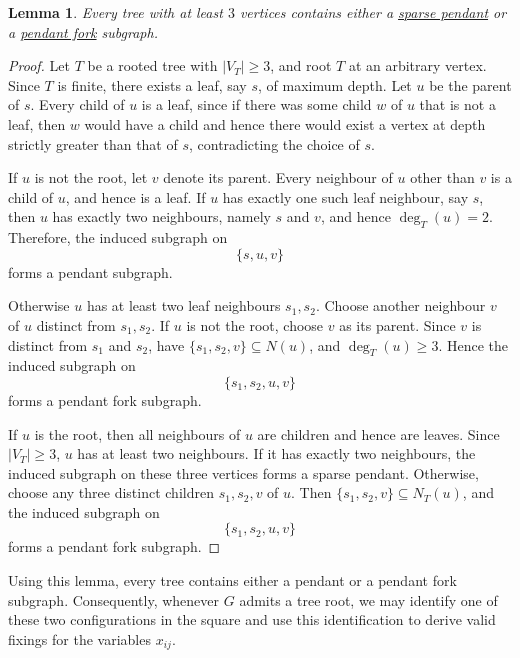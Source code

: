 \documentclass[11pt]{report}
\newtheorem{lemma}{Lemma}
\begin{document}
\begin{lemma} \label{lemma::tree_pendant_pendant_fork}
  Every tree with at least $3$ vertices contains either a \hyperref[def::sparse_pendant]{sparse pendant} or a \hyperref[def::pendant_fork]{pendant fork} subgraph.
\end{lemma}
\begin{proof} 
  Let $T$ be a rooted tree with $|V_T| \ge 3$, and root $T$ at an arbitrary vertex. Since $T$ is finite, there exists a leaf, say $s$, of maximum depth. Let $u$ be the parent of $s$. Every child of $u$ is a leaf, since if there was some child $w$ of $u$ that is not a leaf, then $w$ would have a child and hence there would exist a vertex at depth strictly greater than that of $s$, contradicting the choice of $s$.

  If $u$ is not the root, let $v$ denote its parent. Every neighbour of $u$ other than $v$ is a child of $u$, and hence is a leaf. If $u$ has exactly one such leaf neighbour, say $s$, then $u$ has exactly two neighbours, namely $s$ and $v$, and hence $\deg_T(u)=2$. Therefore, the induced subgraph on
  \[
  \{s,u,v\}
  \]
  forms a pendant subgraph.

  Otherwise $u$ has at least two leaf neighbours $s_1,s_2$. Choose another neighbour $v$ of $u$ distinct from $s_1,s_2$. If $u$ is not the root, choose $v$ as its parent. Since $v$ is distinct from $s_1$ and $s_2$, have $\{s_1,s_2,v\}\subseteq N(u)$, and $\deg_T(u)\ge3$. Hence the induced subgraph on
  \[
  \{s_1,s_2,u,v\}
  \]
  forms a pendant fork subgraph.

  If $u$ is the root, then all neighbours of $u$ are children and hence are leaves. Since $|V_T| \ge 3$, $u$ has at least two neighbours. If it has exactly two neighbours, the induced subgraph on these three vertices forms a sparse pendant. Otherwise, choose any three distinct children $s_1,s_2,v$ of $u$. Then $\{s_1,s_2,v\}\subseteq N_T(u)$, and the induced subgraph on
  \[
    \{s_1,s_2,u,v\}
  \]
  forms a pendant fork subgraph.
\end{proof}

Using this lemma, every tree contains either a pendant or a pendant fork subgraph. Consequently, whenever $G$ admits a tree root, we may identify one of these two configurations in the square and use this identification to derive valid fixings for the variables $x_{ij}$.
\end{document}
